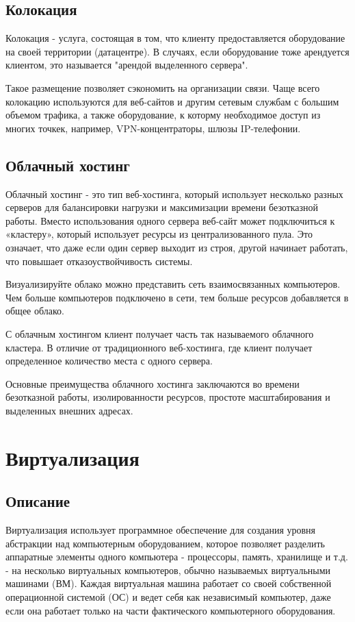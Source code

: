\subsection{Колокация}\label{sec:colo_hosting}
Колокация - услуга, состоящая в том, что клиенту предоставляется оборудование на своей территории (датацентре). В случаях, если оборудование тоже арендуется клиентом, это называется "арендой выделенного сервера".

Такое размещение позволяет сэкономить на организации связи. Чаще всего колокацию используются для веб-сайтов и другим сетевым службам с большим объемом трафика, а также оборудование, к которму необходимое  доступ из многих точкек, например, VPN-концентраторы, шлюзы IP-телефонии.

\subsection{Облачный хостинг}\label{sec:cloud_hosting}
Облачный хостинг - это тип веб-хостинга, который использует несколько разных серверов для балансировки нагрузки и максимизации времени безотказной работы. Вместо использования одного сервера веб-сайт может подключиться к «кластеру», который использует ресурсы из централизованного пула. Это означает, что даже если один сервер выходит из строя, другой начинает работать, что повышает отказоуствойчивость системы.

Визуализируйте облако можно представить сеть взаимосвязанных компьютеров. Чем больше компьютеров подключено в сети, тем больше ресурсов добавляется в общее облако.

С облачным хостингом клиент получает часть так называемого облачного кластера. В отличие от традиционного веб-хостинга, где клиент получает определенное количество места с одного сервера.

Основные преимущества облачного хостинга заключаются во времени безотказной работы, изолированности ресурсов, простоте масштабирования и выделенных внешних адресах.

\section{Виртуализация}\label{sec:ch1/sec2}
\subsection{Описание}\label{sec:virt_decs}
Виртуализация использует программное обеспечение для создания уровня абстракции над компьютерным оборудованием, которое позволяет разделить аппаратные элементы одного компьютера - процессоры, память, хранилище и т.д. - на несколько виртуальных компьютеров, обычно называемых виртуальными машинами (ВМ). Каждая виртуальная машина работает со своей собственной операционной системой (ОС) и ведет себя как независимый компьютер, даже если она работает только на части фактического компьютерного оборудования.

